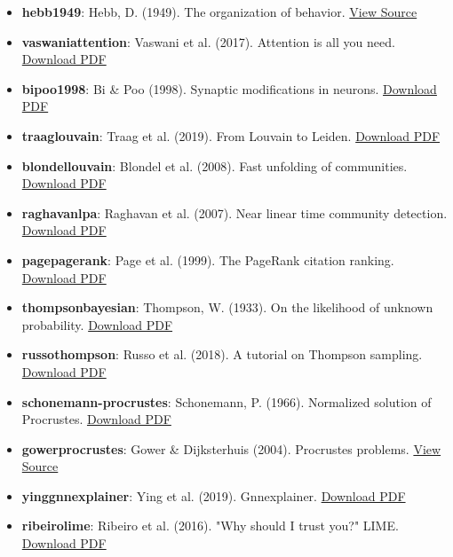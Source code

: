 \documentclass[10pt,journal,compsoc]{IEEEtran}
\begin{document}
\begin{itemize}
\item \textbf{hebb1949}: Hebb, D. (1949). The organ\-ization of behavior. \href{https://archive.org/details/organizationofbe00hebb}{View Source}
\item \textbf{vaswani\-attention}: Vaswani et al. (2017). Attention is all you need. \href{https://arxiv.org/pdf/1706.03762.pdf}{Download PDF}
\item \textbf{bipoo1998}: Bi \& Poo (1998). Synaptic modif\-ications in neurons. \href{https://www.jneurosci.org/content/jneuro/18/24/10464.full.pdf}{Download PDF}
\item \textbf{traag\-louvain}: Traag et al. (2019). From Louvain to Leiden. \href{https://arxiv.org/pdf/1810.08473.pdf}{Download PDF}
\item \textbf{blondel\-louvain}: Blondel et al. (2008). Fast unfolding of communities. \href{https://arxiv.org/pdf/0803.0476.pdf}{Download PDF}
\item \textbf{raghavan\-lpa}: Raghavan et al. (2007). Near linear time community detection. \href{https://arxiv.org/pdf/0709.2931.pdf}{Download PDF}
\item \textbf{page\-pagerank}: Page et al. (1999). The PageRank citation ranking. \href{http://ilpubs.stanford.edu:8090/422/1/1999-66.pdf}{Download PDF}
\item \textbf{thompson\-bayesian}: Thompson, W. (1933). On the likelihood of unknown probability. \href{https://www.gwern.net/docs/statistics/bayes/1933-thompson.pdf}{Download PDF}
\item \textbf{russo\-thompson}: Russo et al. (2018). A tutorial on Thompson sampling. \href{https://web.stanford.edu/~bvr/pubs/TS_Tutorial.pdf}{Download PDF}
\item \textbf{schon\-emann\--procrustes}: Schonemann, P. (1966). Normalized solution of Procrustes. \href{https://psychometrika.org/index.php/psychometrika/article/download/10.1007/BF02289451/1056}{Download PDF}
\item \textbf{gower\-procr\-ustes}: Gower \& Dijkst\-erhuis (2004). Procrustes problems. \href{https://openlibrary.org/books/OL8850117M/Procrustes_problems}{View Source}
\item \textbf{ying\-gnnex\-plainer}: Ying et al. (2019). Gnnexp\-lainer. \href{https://arxiv.org/pdf/1903.03894.pdf}{Download PDF}
\item \textbf{ribeiro\-lime}: Ribeiro et al. (2016). "Why should I trust you?" LIME. \href{https://arxiv.org/pdf/1602.04938.pdf}{Download PDF}

\end{itemize}
\end{document}
